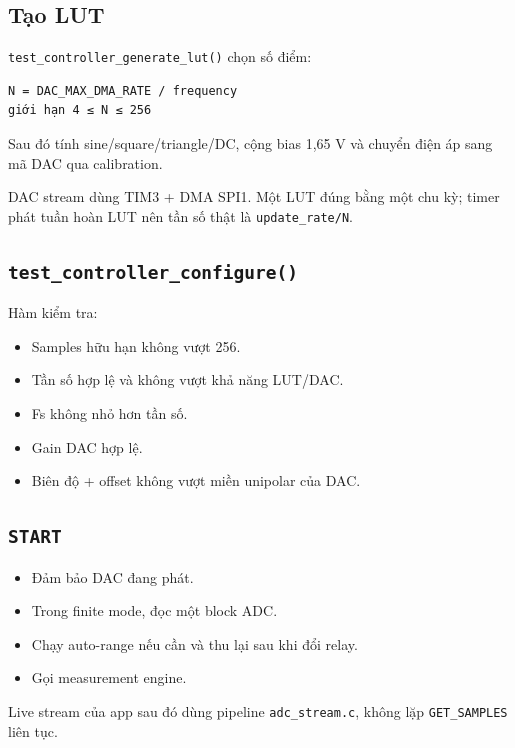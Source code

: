 \documentclass[12pt,a4paper,oneside]{article}
\newcommand{\inlinecode}[1]{\texttt{#1}}
\begin{document}
\subsection{Tạo LUT}

\inlinecode{test\_controller\_generate\_lut()} chọn số điểm:

\begin{Verbatim}[breaklines=true,breakanywhere=true,fontsize=\small]
N = DAC_MAX_DMA_RATE / frequency
giới hạn 4 ≤ N ≤ 256
\end{Verbatim}

Sau đó tính sine/square/triangle/DC, cộng bias 1,65 V và chuyển điện áp sang mã DAC qua calibration.

DAC stream dùng TIM3 + DMA SPI1. Một LUT đúng bằng một chu kỳ; timer phát tuần hoàn LUT nên tần số thật là \inlinecode{update\_rate/N}.

\subsection{\inlinecode{test\_controller\_configure()}}

Hàm kiểm tra:

\begin{itemize}
\item Samples hữu hạn không vượt 256.
\item Tần số hợp lệ và không vượt khả năng LUT/DAC.
\item Fs không nhỏ hơn tần số.
\item Gain DAC hợp lệ.
\item Biên độ + offset không vượt miền unipolar của DAC.
\end{itemize}

\subsection{\inlinecode{START}}

\begin{itemize}
\item Đảm bảo DAC đang phát.
\item Trong finite mode, đọc một block ADC.
\item Chạy auto-range nếu cần và thu lại sau khi đổi relay.
\item Gọi measurement engine.
\end{itemize}

Live stream của app sau đó dùng pipeline \inlinecode{adc\_stream.c}, không lặp \inlinecode{GET\_SAMPLES} liên tục.
\end{document}
